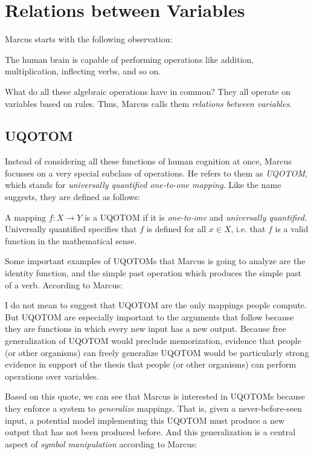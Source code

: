 \documentclass[../../main.tex]{subfiles}
\begin{document}
\chapter{Relations between Variables}
Marcus starts with the following observation:

\begin{observation}
    The human brain is capable of performing operations like addition, multiplication, inflecting verbs, and so on.
\end{observation}

What do all these algebraic operations have in common? They all operate on variables based on rules. Thus, Marcus calls them \emph{relations between variables}.

\section{UQOTOM}
Instead of considering all these functions of human cognition at once, Marcus focusses on a very special subclass of operations. He refers to them as \emph{UQOTOM}, which stands for \emph{universally quantified one-to-one mapping}. Like the name suggests, they are defined as follows:

\begin{definition}[UQOTOM]
    A mapping $f: X \to Y$ is a UQOTOM if it is \emph{one-to-one} and \emph{universally quantified}. Universally quantified specifies that $f$ is defined for all $x \in X$, i.e. that $f$ is a valid function in the mathematical sense.
\end{definition}

Some important examples of UQOTOMs that Marcus is going to analyze are the identity function, and the simple past operation which produces the simple past of a verb. According to Marcus:

\begin{citecallout}
    I do not mean to suggest that UQOTOM are the only mappings
    people compute. But UQOTOM are especially important to the arguments that follow because they are functions in which every new input has a new output. Because free generalization of UQOTOM would
    preclude memorization, evidence that people (or other organisms) can
    freely generalize UQOTOM would be particularly strong evidence in
    support of the thesis that people (or other organisms) can perform operations over variables.
\end{citecallout}

Based on this quote, we can see that Marcus is interested in UQOTOMs because they enforce a system to \emph{generalize} mappings. That is, given a never-before-seen input, a potential model implementing this UQOTOM must produce a new output that has not been produced before. And this generalization is a central aspect of \emph{symbol manipulation} according to Marcus:
\end{document}
